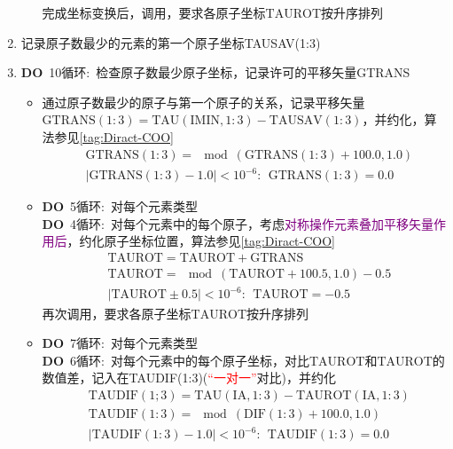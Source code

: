 \documentclass{article}      %
\begin{document}
\begin{enumerate}
\begin{itemize}
			完成坐标变换后，调用，要求各原子坐标$\mathrm{TAUROT}$按升序排列
		\end{itemize}
	\item 记录原子数最少的元素的第一个原子坐标\textrm{TAUSAV(1:3)}
	\item \textbf{DO}~10循环:~检查原子数最少原子坐标，记录许可的平移矢量\textrm{GTRANS}
		\begin{itemize}
			\item 通过原子数最少的原子与第一个原子的关系，记录平移矢量$\mathrm{GTRANS}(1:3)=\mathrm{TAU(IMIN,1:3)}-\mathrm{TAUSAV}(1:3)$，并约化，算法参见\ref{tag:Diract-COO}
		\begin{displaymath}
			\begin{aligned}
				&\mathrm{GTRANS}(1:3)=\mod(\mathrm{GTRANS}(1:3)+100.0,1.0)\\
				&|\mathrm{GTRANS}(1:3)-1.0|<10^{-6}:~~\mathrm{GTRANS(1:3)}=0.0
			\end{aligned}
		\end{displaymath}
		\item \textbf{DO}~5循环:~对每个元素类型\\
		\textbf{DO}~4循环:~对每个元素中的每个原子，考虑\textcolor{purple}{对称操作元素叠加平移矢量作用后}，约化原子坐标位置，算法参见\ref{tag:Diract-COO}
		\begin{displaymath}
			\begin{aligned}
					&\mathrm{TAUROT}=\mathrm{TAUROT}+\mathrm{GTRANS} \\
					&\mathrm{TAUROT}=\mod(\mathrm{TAUROT}+100.5,1.0)-0.5\\
					&|\mathrm{TAUROT}\pm0.5|<10^{-6}:~~ \mathrm{TAUROT}=-0.5
			\end{aligned}
		\end{displaymath}
		再次调用，要求各原子坐标$\mathrm{TAUROT}$按升序排列
		\item \textbf{DO}~7循环:~对每个元素类型\\
		\textbf{DO}~6循环:~对每个元素中的每个原子坐标，对比$\mathrm{TAUROT}$和$\mathrm{TAUROT}$的数值差，记入在\textrm{TAUDIF(1:3)}(\textcolor{red}{“一对一”}对比)，并约化
				\begin{displaymath}
					\begin{aligned}
						&\mathrm{TAUDIF}(1;3)=\mathrm{TAU(IA,1:3)}-\mathrm{TAUROT(IA,1:3)}\\
						&\mathrm{TAUDIF}(1:3)=\mod(\mathrm{DIF}(1:3)+100.0,1.0)\\
						&|\mathrm{TAUDIF}(1:3)-1.0|<10^{-6}:~~ \mathrm{TAUDIF}(1:3)=0.0

\end{aligned}
\end{displaymath}
\end{itemize}
\end{enumerate}
\end{document}
